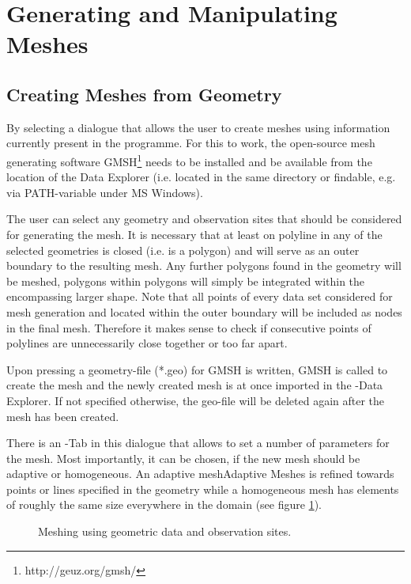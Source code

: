 \section{Generating and Manipulating Meshes}

\subsection{Creating Meshes from Geometry}
\label{meshcreation}

By selecting  a dialogue that allows the user to create meshes using information currently present in the programme. For this to work, the open-source mesh generating software GMSH\footnote{http://geuz.org/gmsh/} needs to be installed and be available from the location of the Data Explorer (i.e. located in the same directory or findable, e.g. via PATH-variable under MS Windows).

The user can select any geometry and observation sites that should be considered for generating the mesh. It is necessary that at least on polyline in any of the selected geometries is closed (i.e. is a polygon) and will serve as an outer boundary to the resulting mesh. Any further polygons found in the geometry will be meshed, polygons within polygons will simply be integrated within the encompassing larger shape. Note that all points of every data set considered for mesh generation and located within the outer boundary will be included as nodes in the final mesh. Therefore it makes sense to check if consecutive points of polylines are unnecessarily close together or too far apart.

Upon pressing  a geometry-file (*.geo) for GMSH is written, GMSH is called to create the mesh and the newly created mesh is at once imported in the \ogs-Data Explorer. If not specified otherwise, the geo-file will be deleted again after the mesh has been created.

There is an -Tab in this dialogue that allows to set a number of parameters for the mesh. Most importantly, it can be chosen, if the new mesh should be adaptive or homogeneous. An adaptive mesh{Adaptive Meshes} is refined towards points or lines specified in the geometry while a homogeneous mesh has elements of roughly the same size everywhere in the domain (see figure \ref{fig:meshing}).

\begin{figure}[tb]
\begin{center}
\enspace
{}\enspace
{}
\end{center}
\caption{Meshing using geometric data and observation sites.} \label{fig:meshing}
\end{figure}

